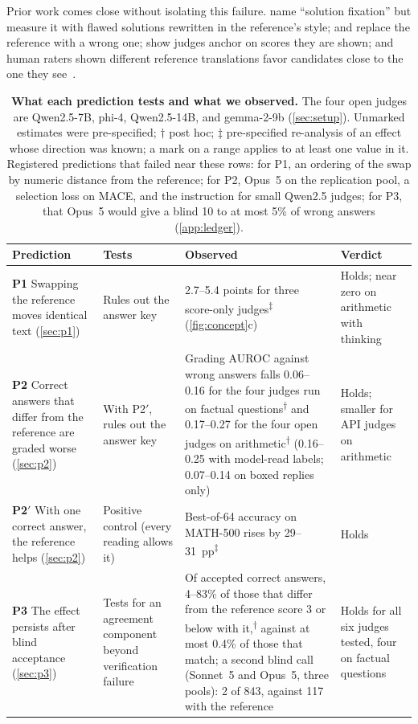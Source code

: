 \documentclass{article}
\newcommand{\reana}{\textsuperscript{$\ddagger$}}
\newcommand{\ph}{\textsuperscript{$\dagger$}}
\begin{document}
Prior work comes close without isolating this failure.
\citet{fixation2025} name ``solution fixation'' but measure it with flawed solutions rewritten in the reference's style; \citet{judgingref2026} and \citet{krumdick2025nofreelabels} replace the reference with a wrong one; \citet{kapetanovic2026anchoring} show judges anchor on scores they are shown; and human raters shown different reference translations favor candidates close to the one they see~\citep{fomicheva2016reference}.

\begin{table}[t]
\centering
\footnotesize
\caption{\textbf{What each prediction tests and what we observed.} The four open judges are Qwen2.5-7B, phi-4, Qwen2.5-14B, and gemma-2-9b (\cref{sec:setup}). Unmarked estimates were pre-specified; $\dagger$ post hoc; $\ddagger$ pre-specified re-analysis of an effect whose direction was known; a mark on a range applies to at least one value in it. Registered predictions that failed near these rows: for P1, an ordering of the swap by numeric distance from the reference; for P2, Opus~5 on the replication pool, a selection loss on \textsc{MACE}, and the instruction for small Qwen2.5 judges; for P3, that Opus~5 would give a blind 10 to at most 5\% of wrong answers (\cref{app:ledger}).}
\label{tab:summary}
\setlength{\tabcolsep}{3.5pt}
\renewcommand{\arraystretch}{1.08}
\begin{tabular}{L{2.65cm}L{2.15cm}L{5.7cm}L{2.4cm}}
\toprule
Prediction & Tests & Observed & Verdict \\
\midrule
\textbf{P1} Swapping the reference moves identical text (\cref{sec:p1}) & Rules out the answer key & 2.7--5.4 points for three score-only judges\reana{} (\cref{fig:concept}c) & Holds; near zero on arithmetic with thinking \\
\addlinespace[2pt]
\textbf{P2} Correct answers that differ from the reference are graded worse (\cref{sec:p2}) & With P2$'$, rules out the answer key & Grading AUROC against wrong answers falls 0.06--0.16 for the four judges run on factual questions\ph{} and 0.17--0.27 for the four open judges on arithmetic\ph{} (0.16--0.25 with model-read labels; 0.07--0.14 on boxed replies only) & Holds; smaller for API judges on arithmetic \\
\addlinespace[2pt]
\textbf{P2$'$} With one correct answer, the reference helps (\cref{sec:p2}) & Positive control (every reading allows it) & Best-of-64 accuracy on MATH-500 rises by 29--31~pp\reana & Holds \\
\addlinespace[2pt]
\textbf{P3} The effect persists after blind acceptance (\cref{sec:p3}) & Tests for an agreement component beyond verification failure & Of accepted correct answers, 4--83\% of those that differ from the reference score 3 or below with it,\ph{} against at most 0.4\% of those that match; a second blind call (Sonnet~5 and Opus~5, three pools): 2 of 843, against 117 with the reference & Holds for all six judges tested, four on factual questions \\

\end{tabular}
\end{table}
\end{document}
